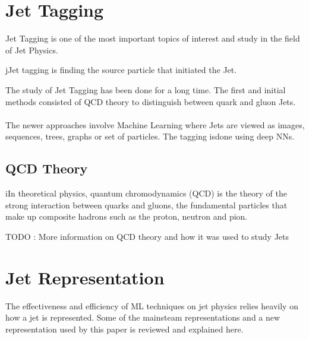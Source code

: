 \section{Jet Tagging}
Jet Tagging is one of the most important topics of interest and study in the 
field of Jet Physics.

\begin{definition}
    jJet tagging is finding the source particle that initiated the Jet.
\end{definition}

\noindent The study of Jet Tagging has been done for a long time. The first and 
initial methods consisted of QCD theory to distinguish between quark and gluon 
Jets.
\\\\
The newer approaches involve Machine Learning where Jets are viewed as images, 
sequences, trees, graphs or set of particles. The tagging isdone using deep 
NNs.

\subsection{QCD Theory}

\begin{definition}
    iIn theoretical physics, quantum chromodynamics (QCD) 
    is the theory of the strong interaction between quarks and gluons, 
    the fundamental particles that make up composite hadrons such as the 
    proton, neutron and pion.
\end{definition}
TODO : More information on QCD theory and how it was used to study Jets

\section{Jet Representation}
The effectiveness and efficiency of ML techniques on jet physics relies 
heavily on how a jet is represented. Some of the mainsteam representations 
and a new representation used by this paper is reviewed and explained here.

